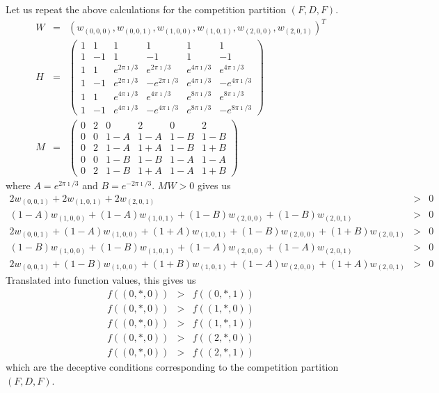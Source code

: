 Let us repeat the above calculations for the competition partition
$(F,D,F)$.
\begin{eqnarray}
W&=&(w_{(0,0,0)},w_{(0,0,1)},w_{(1,0,0)},w_{(1,0,1)},w_{(2,0,0)},w_{(2,0,1)})^T
	\nonumber\\
H&=&\left(\begin{array}{cccccc}
	1&1&1&1&1&1\\
	1&-1&1&-1&1&-1\\
	1&1&e^{2 \pi\imath/3}&e^{2\pi\imath/3}&e^{4\pi\imath/3}&
		e^{4\pi\imath/3}\\
	1&-1&e^{2\pi\imath/3}&-e^{2\pi\imath/3}&e^{4\pi\imath/3}&
		-e^{4\pi\imath/3}\\
	1&1&e^{4\pi\imath/3}&e^{4\pi\imath/3}&e^{8 \pi\imath/3}&
		e^{8\pi\imath/3}\\
	1&-1&e^{4\pi\imath/3}&-e^{4\pi\imath/3}&e^{8 \pi\imath/3}&
		-e^{8\pi\imath/3}
	\end{array} \right) \nonumber\\
M&=&\left(\begin{array}{cccccc}
	0&2&0&2&0&2\\
	0&0&1-A &1-A&1-B&1-B\\
	0&2&1-A&1+A&1-B&1+B\\
	0&0& 1-B&1-B &1-A&1-A\\
	0&2&1-B&1+A&1-A&1+B
\end{array} \right)
\end{eqnarray}
where $A=e^{2 \pi \imath/3}$ and $B=e^{-2 \pi \imath/3}$.  $MW>0$ gives us
\begin{eqnarray}
2 w_{(0,0,1)} + 2 w_{(1,0,1)} + 2 w_{(2,0,1)} &>& 0 \nonumber\\
(1-A) w_{(1,0,0)} + (1-A) w_{(1,0,1)} + (1-B) w_{(2,0,0)}+(1-B) w_{(2,0,1)}&>&0
	\nonumber\\
2 w_{(0,0,1)} + (1-A) w_{(1,0,0)} +(1+A) w_{(1,0,1)} + (1-B) w_{(2,0,0)} +
	(1+B) w_{(2,0,1)} &>& 0 \nonumber\\
(1-B) w_{(1,0,0)} +(1-B)w_{(1,0,1)} + (1-A)w_{(2,0,0)}+(1-A)w_{(2,0,1)}&>&0
	\nonumber\\
2 w_{(0,0,1)} +(1-B) w_{(1,0,0)} +(1+B) w_{(1,0,1)} +(1-A) w_{(2,0,0)}+
	(1+A)w_{(2,0,1)} &>&0
\end{eqnarray}
Translated into function values, this gives us
\begin{eqnarray}
f((0,*,0)) &>& f((0,*,1)) \nonumber\\
f((0,*,0)) &>& f((1,*,0)) \nonumber\\
f((0,*,0)) &>& f((1,*,1)) \nonumber\\
f((0,*,0)) &>& f((2,*,0)) \nonumber\\
f((0,*,0)) &>& f((2,*,1))
\end{eqnarray}
which are the deceptive conditions corresponding to the competition
partition $(F,D,F)$.

